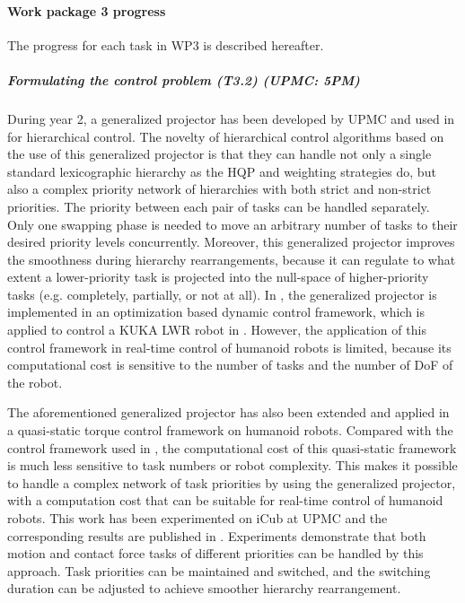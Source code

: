  
\paragraph{Work package 3 progress}

The progress for each task in WP3 is described hereafter.

\subparagraph{Formulating the control problem (T3.2) (UPMC: 5PM)}

During year 2, a generalized projector has been developed by UPMC and used in \cite{liu-AutRob2015} for hierarchical control. The novelty of hierarchical control algorithms based on the use of this generalized projector is that they can handle not only a single standard lexicographic hierarchy as the HQP and weighting strategies do, but also a complex priority network of hierarchies with both strict and non-strict priorities. The priority between each pair of tasks can be handled separately. Only one swapping phase is needed to move an arbitrary number of tasks to their desired priority levels concurrently.  Moreover, this generalized projector improves the smoothness during hierarchy rearrangements, because it can regulate to what extent a lower-priority task is projected into the null-space of higher-priority tasks (e.g. completely, partially, or not at all). In \cite{liu-AutRob2015}, the generalized projector is implemented in an optimization based dynamic control framework, which is applied to control a KUKA LWR robot in \cite{liu_ICRA2015}. However, the application of this control framework in real-time control of humanoid robots is limited, because its computational cost is sensitive to the number of tasks and the number of DoF of the robot.

The aforementioned generalized projector has also been extended and applied in a quasi-static torque control framework on humanoid robots. Compared with the control framework used in \cite{liu-AutRob2015}, the computational cost of this quasi-static framework is much less sensitive to task numbers or robot complexity. This makes it possible to handle a complex network of task priorities by using the generalized projector, with a computation cost that can be suitable for real-time control of humanoid robots. This work has been experimented on iCub at UPMC and the corresponding results are published in \cite{liu-AutRobSI2015}. Experiments demonstrate that both motion and contact force tasks of different priorities can be handled by this approach. Task priorities can be maintained and switched, and the switching duration can be adjusted to achieve smoother hierarchy rearrangement.

